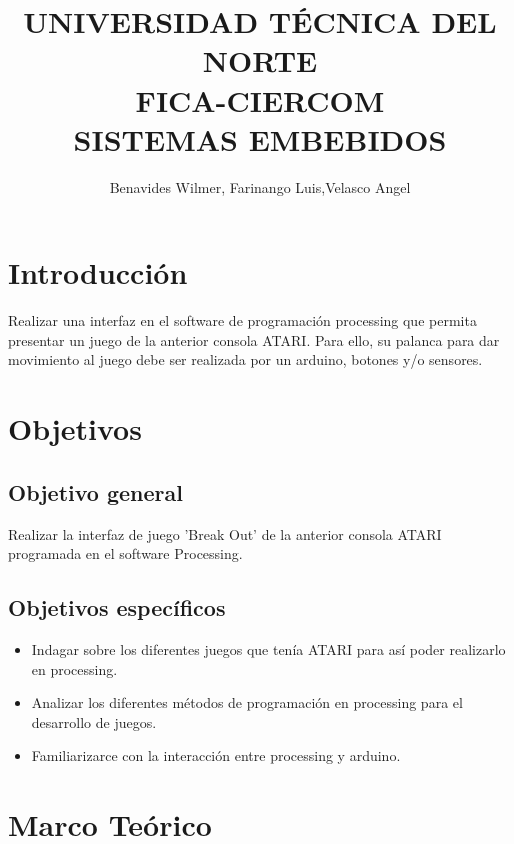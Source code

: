 \documentclass[10pt,a4paper]{article}
\begin{document}
\author{Benavides Wilmer, Farinango Luis,Velasco Angel}
\title{UNIVERSIDAD TÉCNICA DEL NORTE \\
FICA-CIERCOM\\
SISTEMAS EMBEBIDOS}
\maketitle
\begin{multicols}{2}
\section{Introducción}
Realizar una interfaz en el software de programación processing que permita presentar un juego de la anterior consola ATARI. Para ello, su palanca para dar movimiento al juego debe ser realizada por un arduino, botones y/o sensores.


\section{Objetivos} 
\subsection{Objetivo general}
Realizar la interfaz de juego 'Break Out' de la anterior consola ATARI programada en el software Processing.
\subsection{Objetivos específicos}
\begin{itemize}
\renewcommand{\labelitemi}{$-$}
\item Indagar sobre los diferentes juegos que tenía ATARI para así poder realizarlo en processing.
\item Analizar los diferentes métodos de programación en processing para el desarrollo de juegos.
\item Familiarizarce con la interacción entre processing y arduino.

\end{itemize}
\section{Marco Teórico}

\end{multicols}
\end{document}
